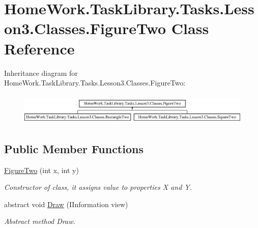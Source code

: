 \hypertarget{class_home_work_1_1_task_library_1_1_tasks_1_1_lesson3_1_1_classes_1_1_figure_two}{}\section{Home\+Work.\+Task\+Library.\+Tasks.\+Lesson3.\+Classes.\+Figure\+Two Class Reference}
\label{class_home_work_1_1_task_library_1_1_tasks_1_1_lesson3_1_1_classes_1_1_figure_two}
Inheritance diagram for Home\+Work.\+Task\+Library.\+Tasks.\+Lesson3.\+Classes.\+Figure\+Two\+:\begin{figure}[H]
\begin{center}
\leavevmode
\includegraphics[height=1.513514cm]{class_home_work_1_1_task_library_1_1_tasks_1_1_lesson3_1_1_classes_1_1_figure_two}
\end{center}
\end{figure}
\subsection*{Public Member Functions}
\begin{DoxyCompactItemize}
\item 
\mbox{\hyperlink{class_home_work_1_1_task_library_1_1_tasks_1_1_lesson3_1_1_classes_1_1_figure_two_ac96e014761ba3f5646c19408d9c03b6e}{Figure\+Two}} (int x, int y)
\begin{DoxyCompactList}\small\item\em Constructor of class, it assigns value to properties X and Y. \end{DoxyCompactList}\item 
abstract void \mbox{\hyperlink{class_home_work_1_1_task_library_1_1_tasks_1_1_lesson3_1_1_classes_1_1_figure_two_a9588ffcda1d6b5778e4670bb48c7060b}{Draw}} (I\+Information view)
\begin{DoxyCompactList}\small\item\em Abstract method Draw. \end{DoxyCompactList}\end{DoxyCompactItemize}
